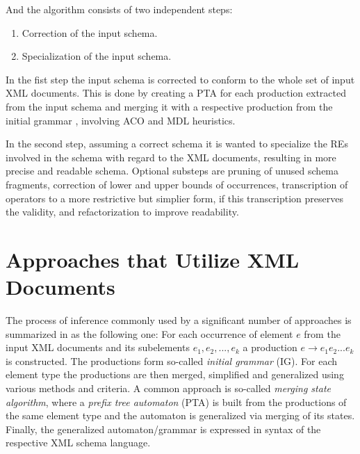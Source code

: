 And the algorithm consists of two independent steps:

\begin{enumerate}
\item Correction of the input schema.
\item Specialization of the input schema.
\end{enumerate}

In the fist step the input schema is corrected to conform to the whole set of input XML documents. This is done by creating a PTA  for each production extracted from the input schema and merging it with a respective production from the initial grammar , involving ACO and MDL heuristics.

In the second step, assuming a correct schema it is wanted to specialize the REs involved in the schema with regard to the XML documents, resulting in more precise and readable schema. Optional substeps are pruning of unused schema fragments, correction of lower and upper bounds of occurrences, transcription of operators to a more restrictive but simplier form, if this transcription preserves the validity, and refactorization to improve readability.



\section{Approaches that Utilize XML Documents}
The process of inference commonly used by a significant number of approaches is summarized in \cite{Mlynkova:2008:AAX:1494650.1495496} as the following one: For each occurrence of element $e$ from the input XML documents and its subelements $e_1, e_2, ..., e_k$ a production $e \rightarrow e_1 e_2 ... e_k$ is constructed. The productions form so-called \emph{initial grammar} (IG). For each element type the productions are then merged, simplified and generalized using various methods and criteria. A common approach is so-called \emph{merging state algorithm}, where a \emph{prefix tree automaton} (PTA) is built from the productions of the same element type and the automaton is generalized via merging of its states. Finally, the generalized automaton/grammar is expressed in syntax of the respective XML schema language.


